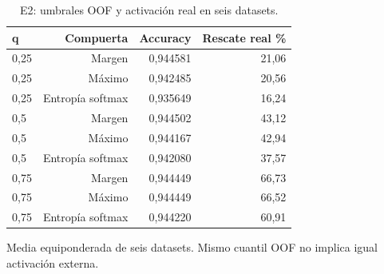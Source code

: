 \begin{table}[!htbp]\centering
\fontsize{8}{10}\selectfont\setlength{\tabcolsep}{4pt}
\caption{E2: umbrales OOF y activación real en seis datasets.}\label{tab:e2-confidence-readable}
\begin{tabular}{@{}lrrr@{}}\toprule
q & Compuerta & Accuracy & Rescate real \%\\\midrule
0,25 & Margen & 0,944581 & 21,06\\
0,25 & Máximo & 0,942485 & 20,56\\
0,25 & Entropía softmax & 0,935649 & 16,24\\
0,5 & Margen & 0,944502 & 43,12\\
0,5 & Máximo & 0,944167 & 42,94\\
0,5 & Entropía softmax & 0,942080 & 37,57\\
0,75 & Margen & 0,944449 & 66,73\\
0,75 & Máximo & 0,944449 & 66,52\\
0,75 & Entropía softmax & 0,944220 & 60,91\\
\bottomrule\end{tabular}
\par\smallskip\begin{minipage}{0.98\textwidth}\footnotesize Media equiponderada de seis datasets. Mismo cuantil OOF no implica igual activación externa.\end{minipage}
\end{table}
